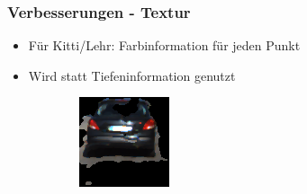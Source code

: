 \begin{frame}
    \frametitle{Verbesserungen - Textur}
    \begin{itemize}
        \item Für Kitti/Lehr: Farbinformation für jeden Punkt
            \pause
        \item Wird statt Tiefeninformation genutzt
            \pause
    \end{itemize}
    \begin{figure}[h!]
        \centering
        \begin{subfigure}[c]{0.3\textwidth}
            \includegraphics[width=\textwidth]{../Material/texture222_0.png}
        \end{subfigure}
        \begin{subfigure}[c]{0.3\textwidth}

\end{subfigure}
\end{figure}
\end{frame}
